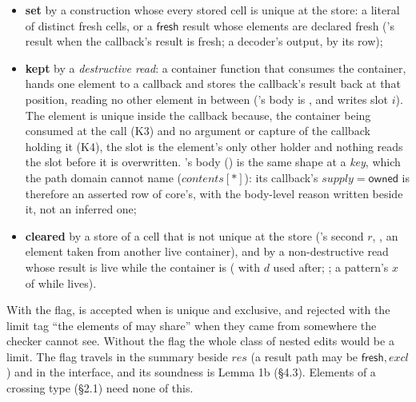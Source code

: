 \begin{itemize}
\item \textbf{set} by a construction whose every stored cell is unique at the store: a literal of distinct fresh cells, or a $\mathsf{fresh}$ result whose elements are declared fresh ('s result when the callback's result is fresh; a decoder's output, by its row);
\item \textbf{kept} by a \emph{destructive read}: a container function that consumes the container, hands one element to a callback and stores the callback's result back at that position, reading no other element in between ('s body is , and  writes slot $i$). The element is unique inside the callback because, the container being consumed at the call (K3) and no argument or capture of the callback holding it (K4), the slot is the element's only other holder and nothing reads the slot before it is overwritten. 's body () is the same shape at a \emph{key}, which the path domain cannot name ($\mathit{contents}[\ast ]$): its callback's $\mathit{supply}=\mathsf{owned}$ is therefore an asserted row of core's, with the body-level reason written beside it, not an inferred one;
\item \textbf{cleared} by a store of a cell that is not unique at the store (\code{[ r, r ]}'s second $r$, , an element taken from another live container), and by a non-destructive read whose result is live while the container is ( with $d$ used after; ; a pattern's $x$ of \code{[ x, …rest ]} while  lives).
\end{itemize}

With the flag,  is accepted when  is unique and exclusive, and rejected with the limit tag “the elements of  may share” when they came from somewhere the checker cannot see. Without the flag the whole class of nested edits would be a limit. The flag travels in the summary beside $\mathit{res}$ (a result path may be $\mathsf{fresh},\allowbreak{}\mathit{excl}$) and in the interface, and its soundness is Lemma 1b (§4.3). Elements of a crossing type (§2.1) need none of this.
